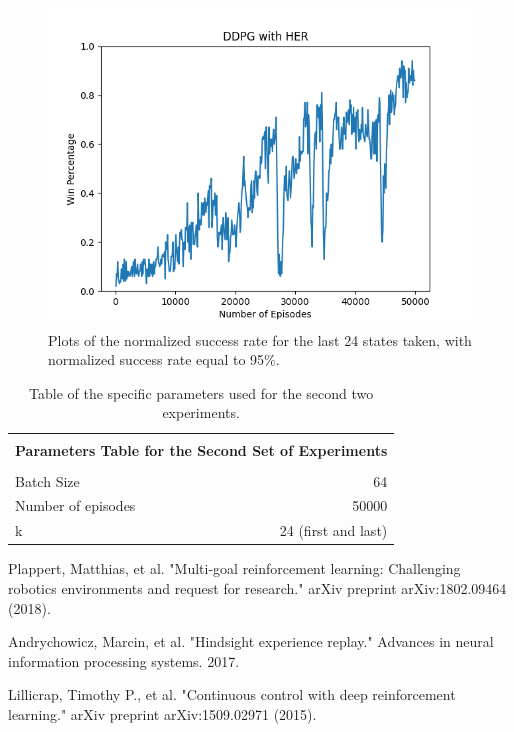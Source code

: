 \documentclass[a4paper]{report}
\begin{document}
\begin{figure}[h!]
\centering
\includegraphics[scale=0.50]{fetchpushnostro.png}
\caption{\label{Fig: img5} Plots of the normalized success rate for the last 24 states taken, with normalized success rate equal to 95\%.}
\end{figure}

\begin{table}[h]
\begin{center}
\begin{tabular}{|l|r|} 



\hline

\multicolumn{2}{|c|}{}\\
\multicolumn{2}{|c|}{\textbf{\large       Parameters Table for the Second Set of Experiments}}\\
\multicolumn{2}{|c|}{}\\

\hline

Batch Size 					& 64			\\
Number of episodes			& 50000			\\
k							& 24 (first and last)	\\


\hline
\end{tabular}
\end{center}
\caption{\label{exp1} Table of the specific parameters used for the second two experiments.}
\end{table}





\begin{thebibliography}{}

Plappert, Matthias, et al. "Multi-goal reinforcement learning: Challenging robotics environments and request for research." arXiv preprint arXiv:1802.09464 (2018).

Andrychowicz, Marcin, et al. "Hindsight experience replay." Advances in neural information processing systems. 2017.

Lillicrap, Timothy P., et al. "Continuous control with deep reinforcement learning." arXiv preprint arXiv:1509.02971 (2015).

\end{thebibliography}
\end{document}
